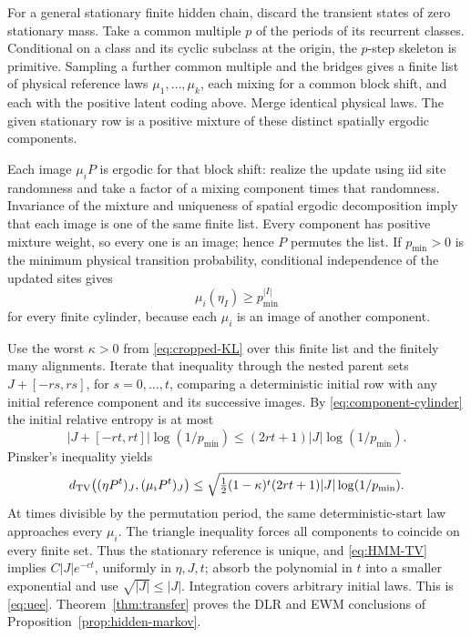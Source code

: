 For a general stationary finite hidden chain, discard the transient states of zero stationary mass. Take a common multiple \(p\) of the periods of its recurrent classes. Conditional on a class and its cyclic subclass at the origin, the \(p\)-step skeleton is primitive. Sampling a further common multiple and the bridges gives a finite list of physical reference laws \(\mu_1,\ldots,\mu_k\), each mixing for a common block shift, and each with the positive latent coding above. Merge identical physical laws. The given stationary row is a positive mixture of these distinct spatially ergodic components.

Each image \(\mu_iP\) is ergodic for that block shift: realize the update using iid site randomness and take a factor of a mixing component times that randomness. Invariance of the mixture and uniqueness of spatial ergodic decomposition imply that each image is one of the same finite list. Every component has positive mixture weight, so every one is an image; hence \(P\) permutes the list. If \(p_{\min}>0\) is the minimum physical transition probability, conditional independence of the updated sites gives
\begin{equation}\label{eq:component-cylinder}
 \mu_i(\eta_I)\ge p_{\min}^{|I|}
\end{equation}
for every finite cylinder, because each \(\mu_i\) is an image of another component.

Use the worst \(\kappa>0\) from \eqref{eq:cropped-KL} over this finite list and the finitely many alignments. Iterate that inequality through the nested parent sets \(J+[-rs,rs]\), for \(s=0,\ldots,t\), comparing a deterministic initial row with any initial reference component and its successive images. By \eqref{eq:component-cylinder} the initial relative entropy is at most
\[
 |J+[-rt,rt]|\log(1/p_{\min})\le(2rt+1)|J|\log(1/p_{\min}).
\]
Pinsker's inequality yields
\begin{equation}\label{eq:HMM-TV}
 d_{\mathrm{TV}}\bigl((\eta P^t)_J,(\mu_iP^t)_J\bigr)
 \le\sqrt{\tfrac12(1-\kappa)^t(2rt+1)|J|\log(1/p_{\min})}.
\end{equation}
At times divisible by the permutation period, the same deterministic-start law approaches every \(\mu_i\). The triangle inequality forces all components to coincide on every finite set. Thus the stationary reference is unique, and \eqref{eq:HMM-TV} implies \(C|J|e^{-ct}\), uniformly in \(\eta,J,t\); absorb the polynomial in \(t\) into a smaller exponential and use \(\sqrt{|J|}\le|J|\). Integration covers arbitrary initial laws. This is \eqref{eq:uee}. Theorem~\ref{thm:transfer} proves the DLR and EWM conclusions of Proposition~\ref{prop:hidden-markov}.

